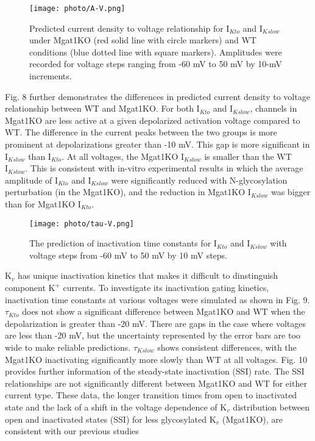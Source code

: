 \documentclass[journal]{IEEEtran}
\begin{document}
\begin{figure}
    \label{fig 8}
    \centering
    \texttt{[image: photo/A-V.png]}
    \caption{Predicted current density to voltage relationship for $\text{I}_{Kto}$ and $\text{I}_{Kslow}$ under Mgat1KO (red solid line with circle markers) and WT conditions (blue dotted line with square markers). Amplitudes were recorded for voltage steps ranging from -60 mV to 50 mV by 10-mV increments.} 
\end{figure}
Fig. 8 further demonstrates the differences in predicted current density to voltage relationship between WT and Mgat1KO. For both $\text{I}_{Kto}$ and $\text{I}_{Kslow}$, channels in Mgat1KO are less active at a given depolarized activation voltage compared to WT. The difference in the current peaks between the two groups is more prominent at depolarizations greater than -10 mV. This gap is more significant in $\text{I}_{Kslow}$ than $\text{I}_{Kto}$. At all voltages, the Mgat1KO $\text{I}_{Kslow}$ is smaller than the WT $\text{I}_{Kslow}$. This is consistent with in-vitro experimental results in which the average amplitude of $\text{I}_{Kto}$ and $\text{I}_{Kslow}$ were significantly reduced with N-glycosylation perturbation (in the Mgat1KO), and the reduction in Mgat1KO $\text{I}_{Kslow}$ was bigger than for Mgat1KO $\text{I}_{Kto}$. 

\begin{figure}
    \label{fign 9}
    \centering
    \texttt{[image: photo/tau-V.png]}
    \caption{The prediction of inactivation time constants for $\text{I}_{Kto}$ and $\text{I}_{Kslow}$ with voltage steps from -60 mV to 50 mV by 10 mV steps.} 
\end{figure}
$\text{K}_{v}$ has unique inactivation kinetics that makes it difficult to dinstinguish component $\text{K}^{+}$ currents. To investigate its inactivation gating kinetics, inactivation time constants at various voltages were simulated as shown in Fig. 9. $\tau_{Kto}$ does not show a significant difference between Mgat1KO and WT when the depolarization is greater than -20 mV. There are gaps in the case where voltages are less than -20 mV, but the uncertainty represented by the error bars are too wide to make reliable predictions. $\tau_{Kslow}$ shows consistent differences, with the Mgat1KO inactivating significantly more slowly than WT at all voltages. Fig. 10 provides further information of the steady-state inactivation (SSI) rate. The SSI relationships are not significantly different between Mgat1KO and WT for either current type. These data, the longer transition times from open to inactivated state and the lack of a shift in the voltage dependence of $\text{K}_{v}$ distribution between open and inactivated states (SSI) for less glycosylated $\text{K}_{v}$ (Mgat1KO), are consistent with our previous studies \cite{schwetz2010n, ednie2015reduced, du2017}
\end{document}
